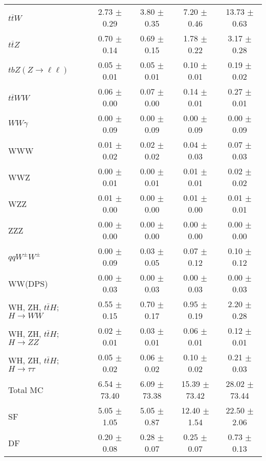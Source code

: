 \begin{tabular}{l|cccc}
                   $t\overline{t}W$ &  2.73 $\pm$  0.29 &  3.80 $\pm$  0.35 &  7.20 $\pm$  0.46 & 13.73 $\pm$  0.63 \\
                   $t\overline{t}Z$ &  0.70 $\pm$  0.14 &  0.69 $\pm$  0.15 &  1.78 $\pm$  0.22 &  3.17 $\pm$  0.28 \\
    $tbZ (Z \rightarrow \ell \ell)$ &  0.05 $\pm$  0.01 &  0.05 $\pm$  0.01 &  0.10 $\pm$  0.01 &  0.19 $\pm$  0.02 \\
                  $t\overline{t}WW$ &  0.06 $\pm$  0.00 &  0.07 $\pm$  0.00 &  0.14 $\pm$  0.01 &  0.27 $\pm$  0.01 \\
                         $WW\gamma$ &  0.00 $\pm$  0.09 &  0.00 $\pm$  0.09 &  0.00 $\pm$  0.09 &  0.00 $\pm$  0.09 \\
                                WWW &  0.01 $\pm$  0.02 &  0.02 $\pm$  0.02 &  0.04 $\pm$  0.03 &  0.07 $\pm$  0.03 \\
                                WWZ &  0.00 $\pm$  0.01 &  0.00 $\pm$  0.01 &  0.01 $\pm$  0.01 &  0.02 $\pm$  0.02 \\
                                WZZ &  0.01 $\pm$  0.00 &  0.00 $\pm$  0.00 &  0.01 $\pm$  0.00 &  0.01 $\pm$  0.01 \\
                                ZZZ &  0.00 $\pm$  0.00 &  0.00 $\pm$  0.00 &  0.00 $\pm$  0.00 &  0.00 $\pm$  0.00 \\
                 $qqW^{\pm}W^{\pm}$ &  0.00 $\pm$  0.09 &  0.03 $\pm$  0.05 &  0.07 $\pm$  0.12 &  0.10 $\pm$  0.12 \\
                            WW(DPS) &  0.00 $\pm$  0.03 &  0.00 $\pm$  0.03 &  0.00 $\pm$  0.03 &  0.00 $\pm$  0.03 \\
WH, ZH, $t\bar{t}H$; $H \rightarrow WW$ &  0.55 $\pm$  0.15 &  0.70 $\pm$  0.17 &  0.95 $\pm$  0.19 &  2.20 $\pm$  0.28 \\
WH, ZH, $t\bar{t}H$; $H \rightarrow ZZ$ &  0.02 $\pm$  0.01 &  0.03 $\pm$  0.01 &  0.06 $\pm$  0.01 &  0.12 $\pm$  0.01 \\
WH, ZH, $t\bar{t}H$; $H \rightarrow \tau\tau$ &  0.05 $\pm$  0.02 &  0.06 $\pm$  0.02 &  0.10 $\pm$  0.02 &  0.21 $\pm$  0.03 \\
\hline\hline
                           Total MC &  6.54 $\pm$ 73.40 &  6.09 $\pm$ 73.38 & 15.39 $\pm$ 73.42 & 28.02 $\pm$ 73.44 \\
\hline
                                 SF &  5.05 $\pm$  1.05 &  5.05 $\pm$  0.87 & 12.40 $\pm$  1.54 & 22.50 $\pm$  2.06 \\
                                 DF &  0.20 $\pm$  0.08 &  0.28 $\pm$  0.07 &  0.25 $\pm$  0.07 &  0.73 $\pm$  0.13 \\

\end{tabular}

